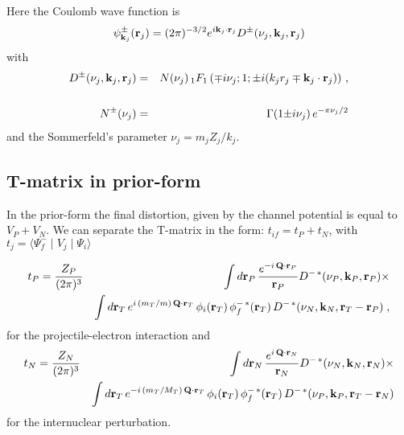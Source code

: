 Here the Coulomb wave function is
\begin{equation}\label{Q:FCC} 
\psi^{\pm}_{{\bf k}_j}({\bf r}_j)  = (2\pi)^{-3/2}e^{i{\bf
k}_j \cdot {\bf r}_j} D^{\pm}(\nu_j,{\bf k}_j,{\bf r}_j)
\end{equation}
%
with
%
\begin{eqnarray}\label{Q:NNorm}
D^{\pm}(\nu_j,{\bf k}_j,{\bf r}_j) &=& N(\nu_j) \,{_1F_1}\left( \mp i
\nu_j;1; {\pm} i(k_j r_j \mp {\bf k}_j\cdot{\bf r}_j ) \right) \, ,\\
\nonumber \\ 
 N^{\pm}(\nu_j)&=& \Gamma(1 {\pm} i\nu_j)\, e^{-\pi \nu_j/2}
\end{eqnarray}
%
and the Sommerfeld's parameter $\nu_j = m_j Z_j/ k_j$.

\subsection{T-matrix in prior-form}
In the prior-form the final distortion, given by the channel potential
is equal to $V_{P} + V_{N}$. We can separate the T-matrix in the form:
$t_{if} = t_{P} + t_{N}$, with $t_{j} = \langle \Psi_{f}^{-}\mid
V_j\mid \Psi_{i} \rangle $

\begin{eqnarray} \label{QA2:6}
t_{P} = \frac{Z_{P}}{(2 \pi)^{3}} && \int d \mathbf{r}_{P} \,
   \frac{e^{- i \, \mathbf{Q} \cdot \mathbf{r}_{P}}}{\mathbf{r}_{P}}
D^{-\,\ast}(\nu_{P},\mathbf{k}_{P},\mathbf{r}_{P}) {\times}
\\
& & \int d \mathbf{r}_{T} \, e^{i \, (m_{T}/m) \, \mathbf{Q} \cdot
\mathbf{r}_T} \, \phi_{i}(\mathbf{r}_T) \, \phi^{-\, \ast}_{f}(\mathbf{r}_T) \,
D^{-\,\ast}(\nu_{N}, \mathbf{k}_{N}, \mathbf{r}_{T} - \mathbf{r}_{P} ) \;,
\nonumber
\end{eqnarray}
%
for the projectile-electron interaction and
%
\begin{eqnarray}\label{QA2:7}
t_{N} = \frac{Z_{N}}{(2 \pi)^{3}} & & \int d \mathbf{r}_{N} \,
   \frac{e^{ i \, \mathbf{Q} \cdot \mathbf{r}_{N}}}{\mathbf{r}_{N}}
D^{-\,\ast}(\nu_{N},\mathbf{k}_{N},\mathbf{r}_{N}) {\times}
\\
 & & \int d \mathbf{r}_T \,
e^{- i \, (m_{T}/M_{T}) \, \mathbf{Q} \cdot \mathbf{r}_T} \,
\phi_{i}(\mathbf{r}_{T})\, \phi^{-\, \ast}_{f}(\mathbf{r}_T) \,
D^{-\,\ast}(\nu_{P}, \mathbf{k}_{P}, \mathbf{r}_{T} - \mathbf{r}_{N} ) \nonumber
\end{eqnarray}
for the internuclear perturbation.

